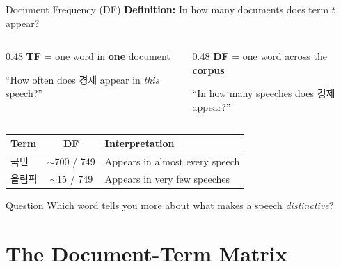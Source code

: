 \documentclass[aspectratio=169,11pt]{beamer}
\begin{document}
\begin{frame}{Document Frequency (DF)}
    \textbf{Definition:} In how many documents does term $t$ appear?

    \vspace{0.3cm}

    \begin{columns}[T]
        \begin{column}{0.48\textwidth}
            \textbf{TF} = one word in \textbf{one} document

            \vspace{0.2cm}
            ``How often does 경제 appear in \textit{this} speech?''
        \end{column}
        \begin{column}{0.48\textwidth}
            \textbf{DF} = one word across the \textbf{corpus}

            \vspace{0.2cm}
            ``In how many speeches does 경제 appear?''
        \end{column}
    \end{columns}

    \vspace{0.5cm}

    \begin{center}
    \begin{tabular}{@{} l c l @{}}
        \toprule
        \textbf{Term} & \textbf{DF} & \textbf{Interpretation} \\
        \midrule
        국민 & $\sim$700 / 749 & Appears in almost every speech \\
        올림픽 & $\sim$15 / 749 & Appears in very few speeches \\
        \bottomrule
    \end{tabular}
    \end{center}

    \vspace{0.3cm}

    \begin{alertblock}{Question}
        Which word tells you more about what makes a speech \textit{distinctive}?
    \end{alertblock}
\end{frame}

\section{The Document-Term Matrix}
\end{document}
